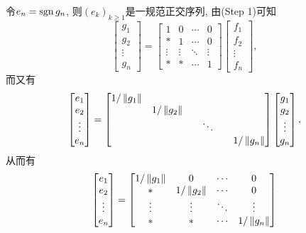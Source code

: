 \begin{Proof}
	令$ e_n=\mathrm{sgn}\, g_n $, 则$ (e_k)_{k\geqslant 1} $是一规范正交序列, 由(Step 1)可知
	\[
	\begin{bmatrix}
	g_1\\g_2\\\vdots\\g_n
	\end{bmatrix}=\begin{bmatrix}
	1 & 0 & \cdots & 0\\ \ast & 1 & \cdots & 0 \\ \vdots & \vdots & \ddots & \vdots\\ \ast & \ast & \cdots & 1
	\end{bmatrix}\begin{bmatrix}
	f_1\\ f_2\\\vdots\\f_n
	\end{bmatrix},
	\]
	而又有
	\[
	\begin{bmatrix}
	e_1\\e_2\\\vdots\\e_n
	\end{bmatrix}=\begin{bmatrix}
	1/\norm{g_1} & \phantom{1/\norm{g_1}} & \phantom{1/\norm{g_1}} & \phantom{1/\norm{g_1}}\\
	\phantom{1/\norm{g_1}} & 1/\norm{g_2} & \phantom{1/\norm{g_1}} & \phantom{1/\norm{g_1}}\\
	\phantom{1/\norm{g_1}} & \phantom{1/\norm{g_1}} & \ddots & \phantom{1/\norm{g_1}}\\
	\phantom{1/\norm{g_1}} & \phantom{1/\norm{g_1}} & \phantom{1/\norm{g_1}} & 1/\norm{g_n}
	\end{bmatrix}\begin{bmatrix}
	g_1\\g_2\\\vdots\\g_n
	\end{bmatrix},
	\]
	从而有
	\[
	\begin{bmatrix}
	e_1\\e_2\\\vdots\\e_n
	\end{bmatrix}=\begin{bmatrix}
	1/\left\| g_1 \right\| & 0 & \cdots & 0\\
	\ast & 1/\left\| g_2 \right\| & \cdots & 0\\
	\vdots & \vdots & \ddots & \vdots\\
	\ast & \ast & \cdots & 1/\left\| g_n \right\|

\end{bmatrix}\]
\end{Proof}
